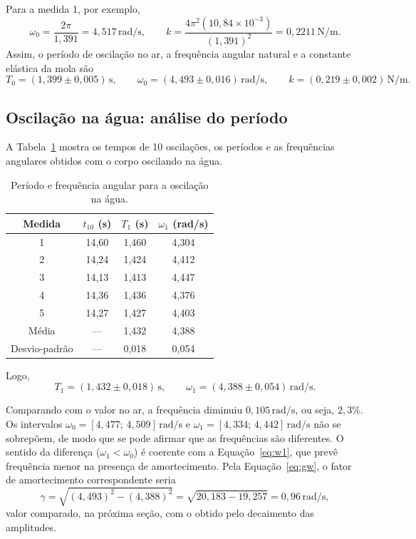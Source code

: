 \documentclass[12pt, a4paper]{article}
\newcommand{\un}[1]{\,\mathrm{#1}}
\newcommand{\fonte}[1]{\par\vspace{2pt}{\footnotesize Fonte: #1}}
\begin{document}
Para a medida 1, por exemplo,
\[
\omega_0=\frac{2\pi}{1{,}391}=4{,}517\un{rad/s},
\qquad
k=\frac{4\pi^2\left(10{,}84\times10^{-3}\right)}{(1{,}391)^2}=0{,}2211\un{N/m}.
\]
Assim, o período de oscilação no ar, a frequência angular natural e a constante elástica da mola são
\[
T_0=(1{,}399\pm0{,}005)\un{s},
\qquad
\omega_0=(4{,}493\pm0{,}016)\un{rad/s},
\qquad
k=(0{,}219\pm0{,}002)\un{N/m}.
\]

\subsection{Oscilação na água: análise do período}

A Tabela~\ref{tab:agua} mostra os tempos de 10 oscilações, os períodos e as frequências angulares obtidos com o corpo oscilando na água.

\begin{table}[H]
\centering
\caption{Período e frequência angular para a oscilação na água.}
\label{tab:agua}
\begin{tabular}{cccc}
\toprule
Medida & $t_{10}$ (s) & $T_1$ (s) & $\omega_1$ (rad/s) \\
\midrule
1 & 14,60 & 1,460 & 4,304 \\
2 & 14,24 & 1,424 & 4,412 \\
3 & 14,13 & 1,413 & 4,447 \\
4 & 14,36 & 1,436 & 4,376 \\
5 & 14,27 & 1,427 & 4,403 \\
\midrule
Média & --- & 1,432 & 4,388 \\
Desvio-padrão & --- & 0,018 & 0,054 \\
\bottomrule
\end{tabular}
\fonte{Elaborada pelos autores.}
\end{table}

Logo,
\[
T_1=(1{,}432\pm0{,}018)\un{s},
\qquad
\omega_1=(4{,}388\pm0{,}054)\un{rad/s}.
\]

Comparando com o valor no ar, a frequência diminuiu $0{,}105\un{rad/s}$, ou seja, $2{,}3\%$. Os intervalos $\omega_0=[4{,}477;\,4{,}509]\un{rad/s}$ e $\omega_1=[4{,}334;\,4{,}442]\un{rad/s}$ não se sobrepõem, de modo que se pode afirmar que as frequências são diferentes. O sentido da diferença ($\omega_1<\omega_0$) é coerente com a Equação~\eqref{eq:w1}, que prevê frequência menor na presença de amortecimento. Pela Equação~\eqref{eq:gw}, o fator de amortecimento correspondente seria
\[
\gamma=\sqrt{(4{,}493)^2-(4{,}388)^2}=\sqrt{20{,}183-19{,}257}=0{,}96\un{rad/s},
\]
valor comparado, na próxima seção, com o obtido pelo decaimento das amplitudes.
\end{document}
